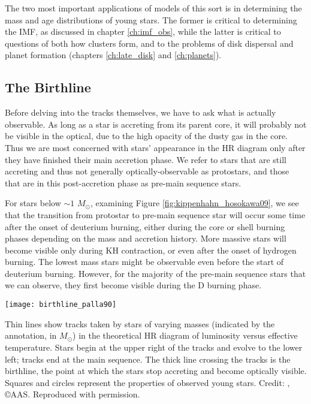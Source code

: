 The two most important applications of models of this sort is in determining the mass and age distributions of young stars. The former is critical to determining the IMF, as discussed in chapter \ref{ch:imf_obs}, while the latter is critical to questions of both how clusters form, and to the problems of disk dispersal and planet formation (chapters \ref{ch:late_disk} and \ref{ch:planets}).

\subsection{The Birthline}

Before delving into the tracks themselves, we have to ask what is actually observable. As long as a star is accreting from its parent core, it will probably not be visible in the optical, due to the high opacity of the dusty gas in the core. Thus we are most concerned with stars' appearance in the HR diagram only after they have finished their main accretion phase. We refer to stars that are still accreting and thus not generally optically-observable as protostars, and those that are in this post-accretion phase as pre-main sequence stars. 

For stars below $\sim 1$ $M_\odot$, examining Figure \ref{fig:kippenhahn_hosokawa09}, we see that the transition from protostar to pre-main sequence star will occur some time after the onset of deuterium burning, either during the core or shell burning phases depending on the mass and accretion history. More massive stars will become visible only during KH contraction, or even after the onset of hydrogen burning. The lowest mass stars might be observable even before the start of deuterium burning. However, for the majority of the pre-main sequence stars that we can observe, they first become visible during the D burning phase.

\begin{marginfigure}
\texttt{[image: birthline\_palla90]}
\caption[The protostellar birthline]{
\label{fig:birthline_palla90}
Thin lines show tracks taken by stars of varying masses (indicated by the annotation, in $M_\odot$) in the theoretical HR diagram of luminosity versus effective temperature. Stars begin at the upper right of the tracks and evolve to the lower left; tracks end at the main sequence. The thick line crossing the tracks is the birthline, the point at which the stars stop accreting and become optically visible. Squares and circles represent the properties of observed young stars. Credit: \citet{palla90a}, \copyright AAS. Reproduced with permission.
}
\end{marginfigure}

